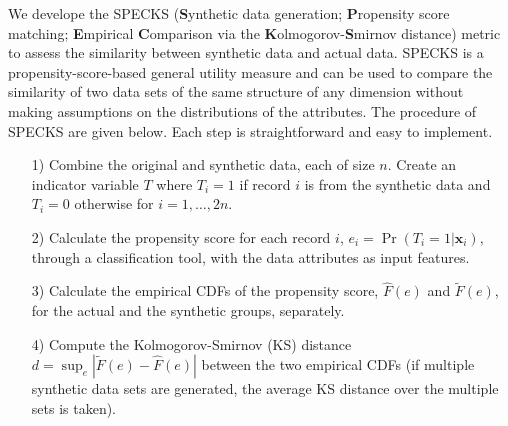 \documentclass[12pt, A4]{article}
\newcommand{\x}{\mathbf{x}}
\theoremstyle{plain}
\theoremstyle{exampstyle}\newtheorem{defn}{Definition}
\theoremstyle{exampstyle}\newtheorem{lem}{Lemma}
\theoremstyle{exampstyle}\newtheorem{cor}{Corollary}
\theoremstyle{exampstyle}\newtheorem{pro}{Proposition}
\theoremstyle{exampstyle}\newtheorem{cla}{Claim}
\theoremstyle{exampstyle}\newtheorem{rem}{Remark}
\begin{document}
We develope the SPECKS (\textbf{S}ynthetic data generation; \textbf{P}ropensity score matching; \textbf{E}mpirical \textbf{C}omparison via the \textbf{K}olmogorov-\textbf{S}mirnov distance) metric to assess the similarity between synthetic data and actual data. SPECKS is a propensity-score-based general utility measure and can be used to compare the similarity of two data sets of the same structure of any dimension without making assumptions on the distributions of the attributes. The procedure of SPECKS are given below. Each step is straightforward and easy to implement.
\begin{itemize}
\item[1) ] Combine the original and synthetic data, each of size $n$. Create an indicator variable $T$ where $T_i=1$ if  record $i$ is from the synthetic data and $T_i=0$ otherwise  for $i=1,\ldots, 2n$.
\item[2) ] Calculate the propensity score for each record $i$, $e_i=\Pr(T_i=1|\x_i)$, through a classification tool, with the data attributes as input features. 
\item[3) ] Calculate the empirical CDFs of the propensity score, $\hat{F}(e)$ and $\tilde{F}(e)$, for the actual and the synthetic groups, separately.
\item[4) ] Compute the  Kolmogorov-Smirnov (KS) distance $d=\sup_{e}|\tilde{F}(e)-\hat{F}(e)|$ between the two empirical CDFs (if multiple synthetic data sets are generated, the average KS distance over the multiple sets is taken).
\end{itemize}

\end{document}
